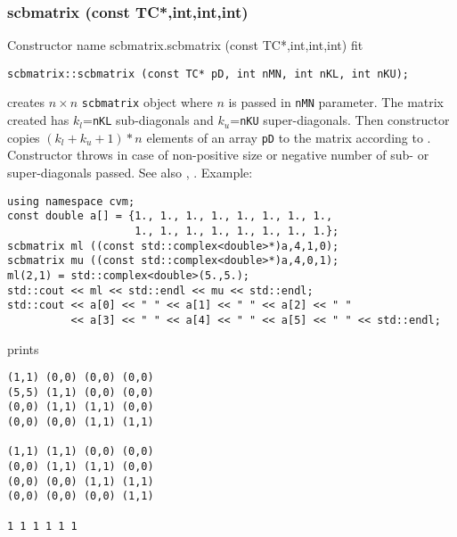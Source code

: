 \subsubsection{scbmatrix (const TC*,int,int,int)}
Constructor%
\pdfdest name {scbmatrix.scbmatrix (const TC*,int,int,int)} fit
\begin{verbatim}
scbmatrix::scbmatrix (const TC* pD, int nMN, int nKL, int nKU);
\end{verbatim}
creates  $n\times n$ \verb"scbmatrix" object where $n$ is passed in
\verb"nMN" parameter. The matrix created has $k_l$=\verb"nKL" 
sub-diagonals and $k_u$=\verb"nKU" super-diagonals.
Then constructor copies $(k_l + k_u + 1)*n$ elements of an array  \verb"pD" to the 
matrix according to .
Constructor throws  
in case of non-positive size or negative number of sub- or super-diagonals 
passed.
See also ,
.
Example:
\begin{Verbatim}
using namespace cvm;
const double a[] = {1., 1., 1., 1., 1., 1., 1., 1., 
                    1., 1., 1., 1., 1., 1., 1., 1.};
scbmatrix ml ((const std::complex<double>*)a,4,1,0);
scbmatrix mu ((const std::complex<double>*)a,4,0,1);
ml(2,1) = std::complex<double>(5.,5.);
std::cout << ml << std::endl << mu << std::endl;
std::cout << a[0] << " " << a[1] << " " << a[2] << " "
          << a[3] << " " << a[4] << " " << a[5] << " " << std::endl;
\end{Verbatim}
prints
\begin{Verbatim}
(1,1) (0,0) (0,0) (0,0)
(5,5) (1,1) (0,0) (0,0)
(0,0) (1,1) (1,1) (0,0)
(0,0) (0,0) (1,1) (1,1)

(1,1) (1,1) (0,0) (0,0)
(0,0) (1,1) (1,1) (0,0)
(0,0) (0,0) (1,1) (1,1)
(0,0) (0,0) (0,0) (1,1)

1 1 1 1 1 1
\end{Verbatim}
\newpage


